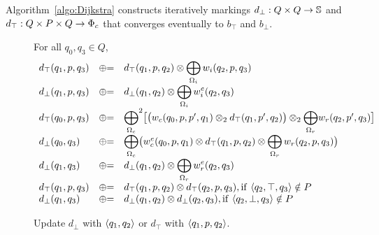 Algorithm~\ref{algo:Dijkstra}
constructs iteratively markings 
$d_\bot : Q \times Q \to \mathbb{S}$ and 
$d_\top : Q \times P \times Q \to \Phic$
that converges eventually to $b_\top$ and $b_\bot$.


\begin{figure}
For all $q_0, q_3 \in Q$, %
\[
\begin{array}{lcl}
d_\top(q_1, p, q_3) & \opluseq &
  d_\top(q_1, p, q_2) \otimes 
  \displaystyle\bigoplus_{\Omegai} \weii(q_2, p, q_3)\\
%
d_\bot(q_1, p, q_3) & \opluseq &
  d_\bot(q_1, q_2) \otimes 
  \displaystyle\bigoplus_{\Omegai} \weiei(q_2, q_3)\\
%     
d_\top(q_0, p, q_3) & \opluseq &
  {\displaystyle\bigoplus_{\Omegac}}^2 
  \bigl[ \bigl( \weic(q_0, p, p', q_1) \otimes_2 
  d_\top(q_1, p', q_2) \bigr) \otimes_2
  {\displaystyle\bigoplus_{\Omegar}} \weir(q_2, p', q_3) \bigr]\\
%
d_\bot(q_0, q_3) & \opluseq &
  {\displaystyle\bigoplus_{\Omegac}}
  \bigl(
  \weiec(q_0, p, q_1) \otimes 
   d_\top(q_1, p, q_2) \otimes
  \displaystyle\bigoplus_{\Omegar} \weir(q_2, p, q_3)\bigr)\\
%
d_\bot(q_1, q_3) & \opluseq &
  d_\bot(q_1, q_2) \otimes 
  \displaystyle\bigoplus_{\Omegar} \weier(q_2, q_3)\\
%
d_\top(q_1, p, q_3) & \opluseq & 
  d_\top(q_1, p, q_2) \otimes d_\top(q_2, p, q_3), 
  \mathrm{if~} \< q_2, \top, q_3> \notin P \\
%
d_\bot(q_1, q_3) & \opluseq & 
  d_\bot(q_1, q_2) \otimes d_\bot(q_2, q_3), \mathrm{if~} \< q_2, \bot, q_3> \notin P \\
\end{array}
\]
%
\caption{Update $d_\bot$ with $\<q_1, q_2>$ or $d_\top$ with $\< q_1, p, q_2>$.} 
\label{fig:best-update}
\end{figure}



